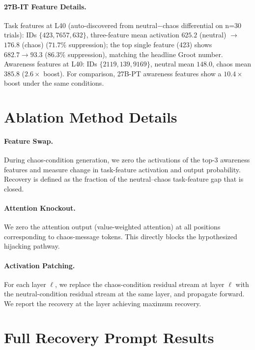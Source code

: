 \documentclass[10pt,twocolumn]{article}
\begin{document}
\paragraph{27B-IT Feature Details.}
Task features at L40 (auto-discovered from neutral$-$chaos differential on n=30 trials): IDs $\{423, 7657, 632\}$, three-feature mean activation $625.2$ (neutral) $\to$ $176.8$ (chaos) ($71.7\%$ suppression); the top single feature (423) shows $682.7 \to 93.3$ ($86.3\%$ suppression), matching the headline Groot number.
Awareness features at L40: IDs $\{2119, 139, 9169\}$, neutral mean $148.0$, chaos mean $385.8$ ($2.6\times$ boost).
For comparison, 27B-PT awareness features show a $10.4\times$ boost under the same conditions.

\section{Ablation Method Details}
\label{app:ablation}

\paragraph{Feature Swap.}
During chaos-condition generation, we zero the activations of the top-3 awareness features and measure change in task-feature activation and output probability.
Recovery is defined as the fraction of the neutral--chaos task-feature gap that is closed.

\paragraph{Attention Knockout.}
We zero the attention output (value-weighted attention) at all positions corresponding to chaos-message tokens.
This directly blocks the hypothesized hijacking pathway.

\paragraph{Activation Patching.}
For each layer $\ell$, we replace the chaos-condition residual stream at layer $\ell$ with the neutral-condition residual stream at the same layer, and propagate forward.
We report the recovery at the layer achieving maximum recovery.

\section{Full Recovery Prompt Results}
\label{app:recovery}
\end{document}
